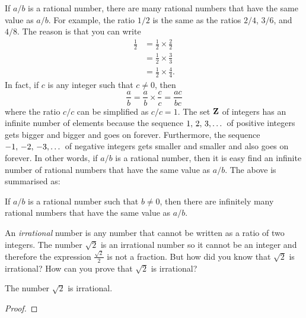 \documentclass[a4paper,oneside,12pt]{article}
\begin{document}

If $a/b$ is a rational number, there are many rational numbers that
have the same value as $a/b$.  For example, the ratio $1/2$ is the
same as the ratios $2/4$, $3/6$, and $4/8$.  The reason is that you
can write
\begin{align*}
\frac{1}{2}
&=
\frac{1}{2} \times \frac{2}{2} \\[4pt]
&=
\frac{1}{2} \times \frac{3}{3} \\[4pt]
&=
\frac{1}{2} \times \frac{4}{4}.
\end{align*}
In fact, if $c$ is any integer such that $c \neq 0$, then
\[
\frac{a}{b}
=
\frac{a}{b} \times \frac{c}{c}
=
\frac{ac}{bc}
\]
where the ratio $c/c$ can be simplified as $c/c = 1$.  The set $\mathbf{Z}$
of integers has an infinite number of elements because the sequence
${1},\, {2},\, {3},\dots$ of positive integers gets bigger and bigger and goes
on forever.  Furthermore, the sequence ${-1},\, {-2},\, {-3},\dots$ of negative
integers gets smaller and smaller and also goes on forever.  In other
words, if $a/b$ is a rational number, then it is easy find an infinite
number of rational numbers that have the same value as $a/b$.  The
above is summarised as:

\begin{theorem}
If $a/b$ is a rational number such that $b \neq 0$, then there are
infinitely many rational numbers that have the same value as $a/b$.
\end{theorem}

An \emph{irrational} number is any number that cannot be written as a
ratio of two integers.  The number $\sqrt{2}$ is an irrational number
so it cannot be an integer and therefore the expression
$\displaystyle{\frac{\sqrt{2}}{2}}$ is not a fraction.  But how did
you know that $\sqrt{2}$ is irrational?  How can you prove that
$\sqrt{2}$ is irrational?

\begin{theorem}
The number $\sqrt{2}$ is irrational.
\end{theorem}

\begin{proof}

\end{proof}
\end{document}
